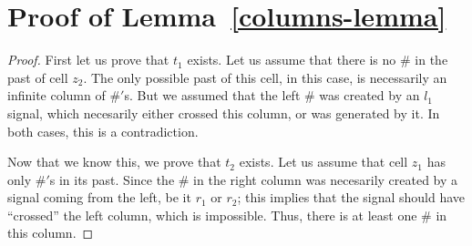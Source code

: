 \documentclass{jac}
\theoremstyle{definition}
\begin{document}
\section{Proof of Lemma~\ref{columns-lemma}}
\begin{proof}
  First let us prove that $t_1$ exists. Let us assume that there is no $\#$ in the
  past of cell $z_2$. The only possible past of this cell, in this case, is
  necessarily an infinite column of $\#'$s. But we assumed that the left $\#$ was
  created by an $l_1$ signal, which necesarily either crossed this column, or was
  generated by it. In both cases, this is a contradiction.

  Now that we know this, we prove that $t_2$ exists. Let us assume that cell
  $z_1$ has only $\#'$s in its past. Since the $\#$ in the right column was
  necesarily created by a signal coming from the left, be it $r_1$ or $r_2$;
  this implies that the signal should have ``crossed'' the left column, which
  is impossible. Thus, there is at least one $\#$ in this column.
\end{proof}
\end{document}
